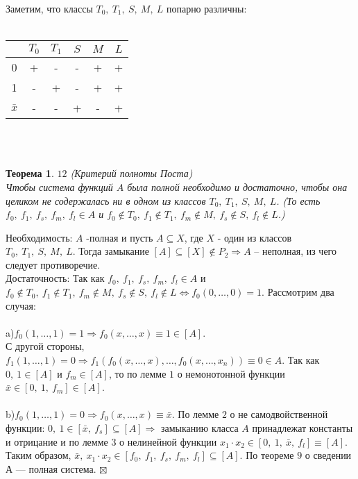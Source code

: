 \documentclass[a4paper, 12pt]{report}
\newenvironment{Proof} %
{\par\noindent{$\blacklozenge$}} %
{\hfill$\scriptstyle\boxtimes$} %
\newtheorem*{theorem}{Теорема} %
\begin{document}
Заметим, что классы $T_0,~ T_1,~ S,~ M,~ L$ попарно различны:\\\\
\begin{tabular}{|c|c|c|c|c|c|}
\hline
  & $T_0$ & $T_1$ & $S$ & $M$ & $L$\\
\hline
   0  & + & - & - & + & + \\
   1  & - & + & - & + & + \\
   $\bar x$ & - & - & + & - & + \\
\hline
\end{tabular}\\\\
\begin{theorem} $12$ (Критерий полноты Поста)\\
  Чтобы система функций $A$ была полной необходимо и достаточно, чтобы она целиком не содержалась ни в одном из классов $T_0,~ T_1,~ S,~ M,~ L$. (То есть $f_0,~ f_1,~ f_s,~ f_m,~ f_l\in A$ и $f_0\notin T_0,~ f_1\notin T_1,~ f_m\notin M,~ f_s\notin S,~ f_l\notin L$.)  
\end{theorem}
\begin{Proof}
Необходимость: $A$ -полная и пусть $A\subseteq X$, где $X$ - один из классов $T_0,~ T_1,~ S,~ M,~ L$. Тогда замыкание $[A]\subseteq [X]\notin P_2 \Rightarrow A$ – неполная, из чего следует противоречие.\\
Достаточность: Так как $f_0,~ f_1,~ f_s,~ f_m,~ f_l\in A$ и $f_0\notin T_0,~ f_1\notin T_1,~ f_m\notin M,~ f_s\notin S,~ f_l\notin L \Leftrightarrow f_0(0,\dotso, 0)= 1$. Рассмотрим два случая:\\\\
a)\quad	$f_0(1, \dotso, 1)=1 \Rightarrow f_0(x, \dotso, x) \equiv 1 \in [A]$.\\ С другой стороны, $f_1(1, \dotso, 1)= 0 \Rightarrow f_1(f_0(x,\dotso,x),\dotso, f_0(x,\dotso,x_n))\equiv 0 \in A$. Так как $0, ~ 1 \in [A]$ и $f_m\in [A]$, то по лемме $1$ о немонотонной функции $\bar x \in [0, ~1,~f_m]\in [A]$.\\\\
b)\quad	$f_0(1, \dotso, 1) = 0 \Rightarrow f_0(x, \dotso, x)\equiv \bar x$. По лемме $2$ о не самодвойственной функции: $0,~ 1 \in [\bar x,~ f_s] \subseteq [A] \Rightarrow$ замыканию класса $A$ принадлежат константы и отрицание и по лемме $3$ о нелинейной функции $x_1\cdot x_2\in [0,~ 1,~ \bar x, ~ f_l]\equiv [A]$.\\
Таким образом, $\bar x, ~ x_1 \cdot x_2 \in [f_0,~ f_1, ~f_s, ~ f_m,~ f_l] \subseteq [A]$. По теореме $9$ о сведении А — полная система.  
\end{Proof}\\\\
\end{document}
